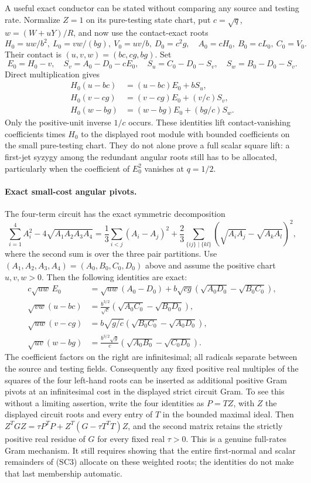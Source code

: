A useful exact conductor can be stated without comparing any source
and testing rate. Normalize $Z=1$ on its pure-testing state chart,
put $c=\sqrt q$, $w=(W+uY)/R$, and now use the contact-exact roots
\[
 H_0=uw/b^2,\ L_0=vw/(bg),\ V_0=uv/b,\ D_0=c^2g,
 \quad A_0=cH_0,\ B_0=cL_0,\ C_0=V_0.
\]
Their contact is $(u,v,w)=(bc,cg,bg)$. Set
\[
 E_0=H_0-v,\quad
 S_v=A_0-D_0-cE_0,\quad
 S_u=C_0-D_0-S_v,\quad S_w=B_0-D_0-S_v.
\]
Direct multiplication gives
\[
\begin{aligned}
 H_0(u-bc)&=(u-bc)E_0+bS_u,\\
 H_0(v-cg)&=(v-cg)E_0+(v/c)S_v,\\
 H_0(w-bg)&=(w-bg)E_0+(bg/c)S_w.
\end{aligned}                                                     \tag{SC7}
\]
Only the positive-unit inverse $1/c$ occurs. These identities lift
contact-vanishing coefficients times $H_0$ to the displayed root
module with bounded coefficients on the small pure-testing chart.
They do not alone prove a full scalar square lift: a first-jet
syzygy among the redundant angular roots still has to be allocated,
particularly when the coefficient of $E_0^2$ vanishes at $q=1/2$.

\paragraph{Exact small-cost angular pivots.}
The four-term circuit has the exact symmetric decomposition
\[
 \sum_{i=1}^4A_i^2-4\sqrt{A_1A_2A_3A_4}
 =\frac13\sum_{i<j}(A_i-A_j)^2
  +\frac23\sum_{\{ij\}\mid\{kl\}}
       (\sqrt{A_iA_j}-\sqrt{A_kA_l})^2,
\]
where the second sum is over the three pair partitions. Use
$(A_1,A_2,A_3,A_4)=(A_0,B_0,C_0,D_0)$ above and assume the positive
chart $u,v,w>0$. Then the following identities are exact:
\[
\begin{aligned}
 c\sqrt{uw}\,E_0
 &=\sqrt{uw}(A_0-D_0)
      +b\sqrt{cg}(\sqrt{A_0D_0}-\sqrt{B_0C_0}),\\
 \sqrt{vw}(u-bc)
 &=\frac{b^{3/2}}{\sqrt c}
             (\sqrt{A_0C_0}-\sqrt{B_0D_0}),\\
 \sqrt{uw}(v-cg)
 &=b\sqrt{g/c}
             (\sqrt{B_0C_0}-\sqrt{A_0D_0}),\\
 \sqrt{uv}(w-bg)
 &=\frac{b^{3/2}\sqrt g}{c}
             (\sqrt{A_0B_0}-\sqrt{C_0D_0}).
\end{aligned}                                                     \tag{SC9}
\]
The coefficient factors on the right are infinitesimal; all radicals
separate between the source and testing fields. Consequently any fixed
positive real multiples of the squares of the four left-hand roots can
be inserted as additional positive Gram pivots at an infinitesimal cost
in the displayed strict circuit Gram. To see this without a limiting
assertion, write the four identities as $P=TZ$, with $Z$ the displayed
circuit roots and every entry of $T$ in the bounded maximal ideal. Then
$Z^TGZ=\tau P^TP+Z^T(G-\tau T^TT)Z$, and the second matrix retains
the strictly positive real residue of $G$ for every fixed real $\tau>0$.
This is a genuine full-rates Gram mechanism. It still requires showing
that the entire first-normal and scalar remainders of (SC3) allocate on
these weighted roots; the identities do not make that last membership
automatic.

